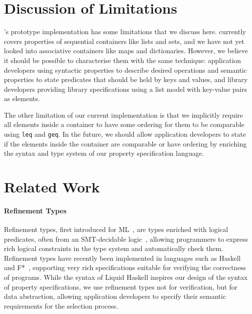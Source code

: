 \section{Discussion of Limitations}
\label{chap2:limitations}
\Primrose{}'s prototype implementation has some limitations that we discuss here.
\Primrose{} currently covers properties of sequential containers like lists and sets, and we have not yet looked into associative containers like maps and dictionaries.
However, we believe it should be possible to characterise them with the same technique:
application developers using syntactic properties to describe desired operations and semantic properties to state predicates that should be held by keys and values, and library developers providing library specifications using a list model with key-value pairs as elements.

The other limitation of our current implementation is that we implicitly require all elements inside a container to have some ordering for them to be comparable using \verb|leq| and \verb|geq|. In the future, we should allow application developers to state if the elements inside the container are comparable or have ordering by enriching the syntax and type system of our property specification language.

\section{Related Work}
\label{chap2:related-work}
\paragraph*{Refinement Types}
Refinement types, first introduced for ML~\citep{10.1145/113445.113468}, are types enriched with logical predicates, often from an SMT-decidable logic~\citep{10.1145/1863543.1863560}, allowing programmers to express 
rich logical constraints in the type system and automatically check them.
Refinement types have recently been implemented in languages such as Haskell~\citep{DBLP:conf/esop/VazouRJ13, 10.1145/2692915.2628161}
and F*~\citep{fstar}, supporting very rich specifications suitable for verifying the correctness of programs. 
While the syntax of Liquid Haskell inspires our design of the syntax of property specifications, we use refinement types not for verification, but for data abstraction, allowing application developers to specify their semantic requirements for the selection process.

